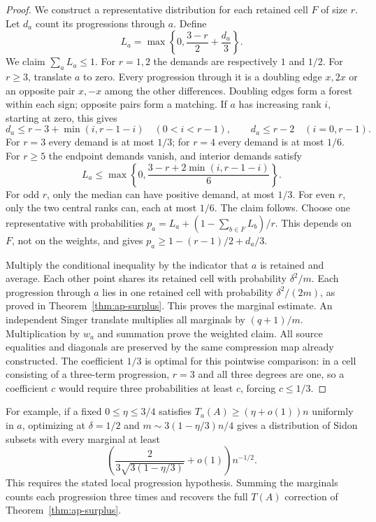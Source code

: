 \documentclass[11pt]{article}
\theoremstyle{definition}
\theoremstyle{remark}
\begin{document}
\begin{proof}
We construct a representative distribution for each retained cell $F$
of size $r$. Let $d_a$ count its progressions through $a$. Define
\[
L_a=\max\left\{0,\frac{3-r}{2}+\frac{d_a}{3}\right\}.
\]
We claim $\sum_aL_a\le1$. For $r=1,2$ the demands are respectively
$1$ and $1/2$. For $r\ge3$, translate $a$ to zero. Every progression
through it is a doubling edge $x,2x$ or an opposite pair $x,-x$ among
the other differences. Doubling edges form a forest within each sign;
opposite pairs form a matching. If $a$ has increasing rank $i$, starting
at zero, this gives
\[
d_a\le r-3+\min(i,r-1-i)\quad(0<i<r-1),\qquad
d_a\le r-2\quad(i=0,r-1).
\]
For $r=3$ every demand is at most $1/3$; for $r=4$ every demand is at
most $1/6$. For $r\ge5$ the endpoint demands vanish, and interior
demands satisfy
\[
L_a\le\max\left\{0,\frac{3-r+2\min(i,r-1-i)}6\right\}.
\]
For odd $r$, only the median can have positive demand, at most $1/3$.
For even $r$, only the two central ranks can, each at most $1/6$.
The claim follows. Choose one representative with probabilities
$p_a=L_a+(1-\sum_{b\in F}L_b)/r$. This depends on $F$, not on the
weights, and gives $p_a\ge1-(r-1)/2+d_a/3$.

Multiply the conditional inequality by the indicator that $a$ is
retained and average. Each other point shares its retained cell with
probability $\delta^2/m$. Each progression through $a$ lies in one
retained cell with probability $\delta^2/(2m)$, as proved in
Theorem~\ref{thm:ap-surplus}. This proves the marginal estimate.
An independent Singer translate multiplies all marginals by
$(q+1)/m$. Multiplication by $w_a$ and summation prove the weighted
claim. All source equalities and diagonals are preserved by the same
compression map already constructed. The coefficient $1/3$ is optimal
for this pointwise comparison: in a cell consisting of a three-term
progression, $r=3$ and all three degrees are one, so a coefficient $c$
would require three probabilities at least $c$, forcing $c\le1/3$.
\end{proof}

For example, if a fixed $0\le\eta\le3/4$ satisfies
$T_a(A)\ge(\eta+o(1))n$ uniformly in $a$, optimizing
at $\delta=1/2$ and $m\sim3(1-\eta/3)n/4$ gives a distribution of
Sidon subsets with every marginal at least
\[
\left(\frac{2}{3\sqrt{3(1-\eta/3)}}+o(1)\right)n^{-1/2}.
\]
This requires the stated local progression hypothesis. Summing the
marginals counts each progression three times and recovers the full
$T(A)$ correction of Theorem~\ref{thm:ap-surplus}.
\end{document}
